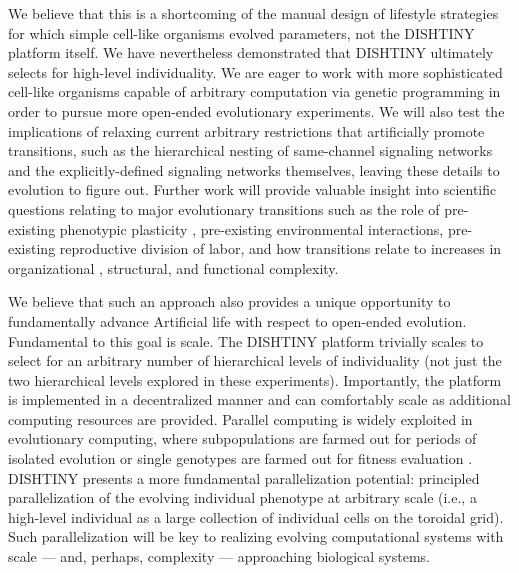We believe that this is a shortcoming of the manual design of lifestyle strategies for which simple cell-like organisms evolved parameters, not the DISHTINY platform itself.
We have nevertheless demonstrated that DISHTINY ultimately selects for high-level individuality.
We are eager to work with more sophisticated cell-like organisms capable of arbitrary computation via genetic programming in order to pursue more open-ended evolutionary experiments.
We will also test the implications of relaxing current arbitrary restrictions that artificially promote transitions, such as the hierarchical nesting of same-channel signaling networks and the explicitly-defined signaling networks themselves, leaving these details to evolution to figure out.
Further work will provide valuable insight into scientific questions relating to major evolutionary transitions such as the role of pre-existing phenotypic plasticity \citep{clune2007investigating, lalejini2016evolutionary}, pre-existing environmental interactions, pre-existing reproductive division of labor, and how transitions relate to increases in organizational \citep{goldsby2012task}, structural, and functional \citep{goldsby2014evolutionary} complexity.

We believe that such an approach also provides a unique opportunity to fundamentally advance Artificial life with respect to open-ended evolution.
Fundamental to this goal is scale.
The DISHTINY platform trivially scales to select for an arbitrary number of hierarchical levels of individuality (not just the two hierarchical levels explored in these experiments).
Importantly, the platform is implemented in a decentralized manner and can comfortably scale as additional computing resources are provided.
Parallel computing is widely exploited in evolutionary computing, where subpopulations are farmed out for periods of isolated evolution or single genotypes are farmed out for fitness evaluation
\citep{lin1994coarse, real17a}.
DISHTINY presents a more fundamental parallelization potential: principled parallelization of the evolving individual phenotype at arbitrary scale (i.e., a high-level individual as a large collection of individual cells on the toroidal grid).
Such parallelization will be key to realizing evolving computational systems with scale --- and, perhaps, complexity --- approaching biological systems.
